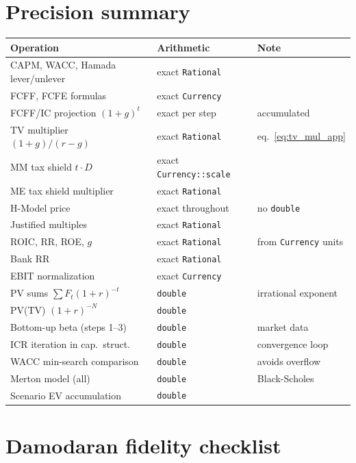 \documentclass[12pt, a4paper, oneside]{book}
\begin{document}
\section{Precision summary}

\begin{center}
\small
\begin{tabular}{lll}
\toprule
\textbf{Operation} & \textbf{Arithmetic} & \textbf{Note}\\
\midrule
CAPM, WACC, Hamada lever/unlever & exact \texttt{Rational} & \\
FCFF, FCFE formulas & exact \texttt{Currency} & \\
FCFF/IC projection $(1+g)^t$ & exact per step & accumulated\\
TV multiplier $(1+g)/(r-g)$ & exact \texttt{Rational} & eq.~\eqref{eq:tv_mul_app}\\
MM tax shield $t\cdot D$ & exact \texttt{Currency::scale} & \\
ME tax shield multiplier & exact \texttt{Rational} & \\
H-Model price & exact throughout & no \texttt{double}\\
Justified multiples & exact \texttt{Rational} & \\
ROIC, RR, ROE, $g$ & exact \texttt{Rational} & from \texttt{Currency} units\\
Bank RR & exact \texttt{Rational} & \\
EBIT normalization & exact \texttt{Currency} & \\
\midrule
PV sums $\sum F_t(1+r)^{-t}$ & \texttt{double} & irrational exponent\\
PV(TV) $(1+r)^{-N}$ & \texttt{double} & \\
Bottom-up beta (steps 1--3) & \texttt{double} & market data\\
ICR iteration in cap.\ struct. & \texttt{double} & convergence loop\\
WACC min-search comparison & \texttt{double} & avoids overflow\\
Merton model (all) & \texttt{double} & Black-Scholes\\
Scenario EV accumulation & \texttt{double} & \\
\bottomrule
\end{tabular}
\end{center}

\section{Damodaran fidelity checklist}
\end{document}
